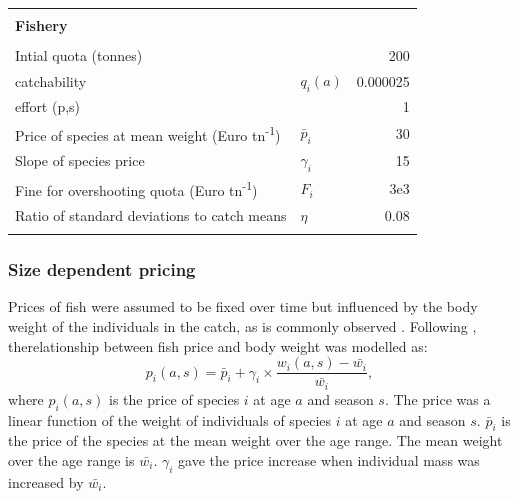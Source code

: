 \documentclass[12pt,oneline,a4paper,numbib]{ouparticle}
\numberwithin{equation}{subsection} %
\begin{document}
\begin{table}[!h]
{\begin{tabular}{@{}llr@{}}
&                 \\  
\textbf{Fishery }                                           &             \\ \hline   
&  \\%

Intial quota  (tonnes)                                      &                       & 200 \\%
catchability                                                & $q_i (a)$             & 0.000025        \\ 
effort (p,s)                                                &                       & 1                 \\ 
Price of species at mean weight (Euro tn\textsuperscript{-1})& $\bar{p}_i$          & 30             \\
Slope of species price                                      & $\gamma_i$            & 15            \\
Fine for overshooting quota  (Euro tn\textsuperscript{-1})  &  $F_i$                & 3e3              \\
Ratio of standard deviations to catch means                 & $\eta$                & 0.08           \\ 
&                 \\  \hline%
\end{tabular}
}
\end{table}

\subsubsection{Size dependent pricing}

Prices of fish were assumed to be fixed over time but influenced by the body weight of the individuals in the catch, as is commonly observed \cite{Zimmermann2011, Zimmermann2013}. Following \cite{Zimmermann2011}, therelationship between fish price and body weight was modelled as:  
\begin{equation}
 p_i (a,s) = \bar{p}_i + \gamma_i \times \frac{w_i (a,s) -\bar{w_i}}{\bar{w_i}},
\end{equation}
where $p_i (a,s) $ is the price of species $i$ at age $a$ and season $s$. The price was a linear function of the weight of individuals of species $i$ at age $a$ and season $s$. $\bar{p}_i$ is the price of the species at the mean weight over the age range. The mean weight over the age range is $\bar{w_i}$. $\gamma_i$ gave the price increase when individual mass was increased by $\bar{w_i}$. 
\end{document}
